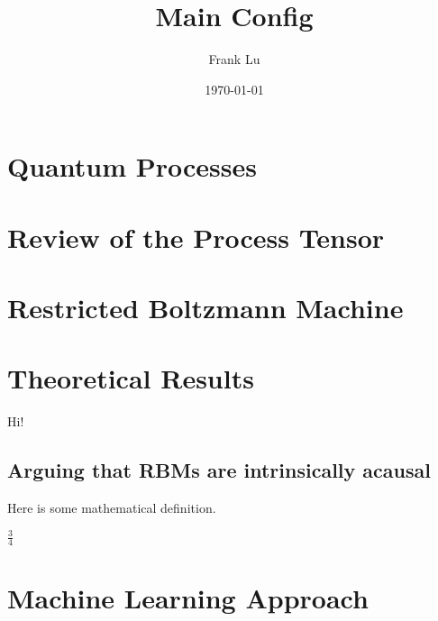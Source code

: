 \documentclass[11pt]{article}
\author{Frank Lu}
\date{\today}
\title{Main Config}
\begin{document}
\maketitle
\tableofcontents


\section{Quantum Processes}
\label{sec:org8d55c96}
\section{Review of the Process Tensor}
\label{sec:org24b325a}
\section{Restricted Boltzmann Machine}
\label{sec:orgaf84c34}
\section{Theoretical Results}
\label{sec:org09b813a}
\newcommand{\nH}{N_H}
\newcommand{\NH}{N_H}
\newcommand{\NV}{N_H}

\newcommand{\as}{a_1a_2 \dots a_{\nh}}
\newcommand{\ones}{1, 1, \dots, 1}
\newcommand{\ks}{k_1k_2 \dots b_{\nh}}

\newsavebox{\mybox}
\newenvironment{Notes}
{\begin{lrbox}{\mybox}\begin{minipage}{\textwidth}}
{\end{minipage}\end{lrbox}\fbox{\usebox{\mybox}}\\}

Hi!

\subsection{Arguing that RBMs are intrinsically acausal}
\label{sec:org6f39cbc}

Here is some mathematical definition.

\(\frac{3}{4}\)
\section{Machine Learning Approach}
\label{sec:org49857af}
\end{document}
